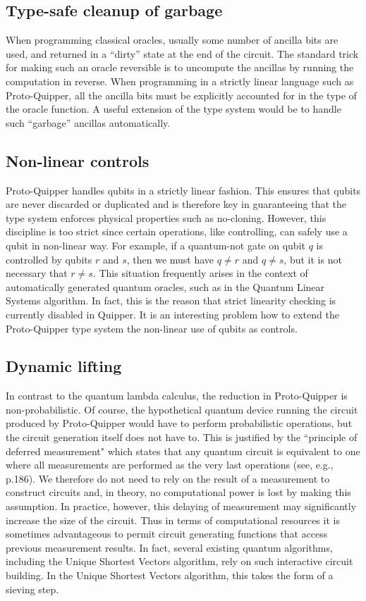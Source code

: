 \documentclass[twoside]{article}
\begin{document}
\subsection{Type-safe cleanup of garbage}

When programming classical oracles, usually some number of ancilla
bits are used, and returned in a ``dirty'' state at the end of the
circuit. The standard trick for making such an oracle reversible is to
uncompute the ancillas by running the computation in reverse. When
programming in a strictly linear language such as Proto-Quipper, all
the ancilla bits must be explicitly accounted for in the type of the
oracle function. A useful extension of the type system would be to
handle such ``garbage'' ancillas automatically.

\subsection{Non-linear controls}

Proto-Quipper handles qubits in a strictly linear fashion. This
ensures that qubits are never discarded or duplicated and is therefore
key in guaranteeing that the type system enforces physical properties
such as no-cloning. However, this discipline is too strict since
certain operations, like controlling, can safely use a qubit in
non-linear way. For example, if a quantum-not gate on qubit $q$ is
controlled by qubits $r$ and $s$, then we must have $q\neq r$ and
$q\neq s$, but it is not necessary that $r\neq s$. This situation
frequently arises in the context of automatically generated quantum
oracles, such as in the Quantum Linear Systems algorithm. In fact,
this is the reason that strict linearity checking is currently
disabled in Quipper. It is an interesting problem how to extend the
Proto-Quipper type system the non-linear use of qubits as controls.

\subsection{Dynamic lifting}

In contrast to the quantum lambda calculus, the reduction in
Proto-Quipper is non-probabilistic. Of course, the hypothetical
quantum device running the circuit produced by Proto-Quipper would
have to perform probabilistic operations, but the circuit generation
itself does not have to. This is justified by the ``principle of
deferred measurement" which states that any quantum circuit is
equivalent to one where all measurements are performed as the very
last operations (see, e.g., \cite{NC02} p.186). We therefore do not
need to rely on the result of a measurement to construct circuits and,
in theory, no computational power is lost by making this
assumption. In practice, however, this delaying of measurement may
significantly increase the size of the circuit. Thus in terms of
computational resources it is sometimes advantageous to permit circuit
generating functions that access previous measurement results. In
fact, several existing quantum algorithms, including the Unique
Shortest Vectors algorithm, rely on such interactive circuit
building. In the Unique Shortest Vectors algorithm, this takes the
form of a sieving step. 
\end{document}
